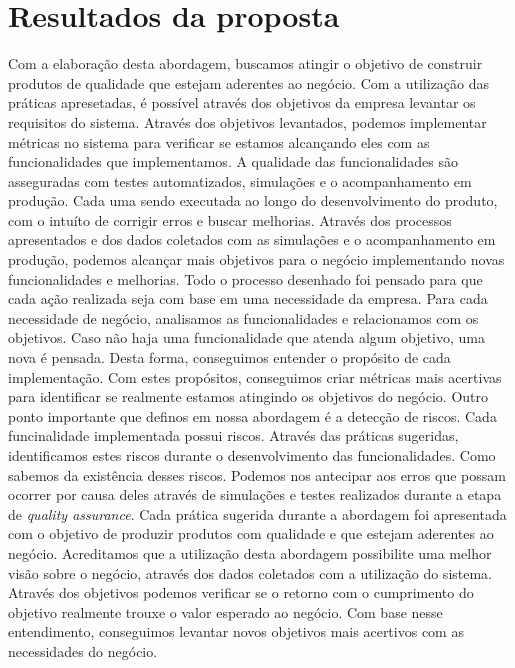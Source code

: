   \section{Resultados da proposta}
    Com a elaboração desta abordagem, buscamos atingir o objetivo de construir
    produtos de qualidade que estejam aderentes ao negócio. Com a utilização das
    práticas apresetadas, é possível através dos objetivos da empresa levantar os
    requisitos do sistema. Através dos objetivos levantados, podemos implementar
    métricas no sistema para verificar se estamos alcançando eles com as funcionalidades
    que implementamos. \newline
    A qualidade das funcionalidades são asseguradas com testes automatizados,
    simulações e o acompanhamento em produção. Cada uma sendo executada ao longo
    do desenvolvimento do produto, com o intuíto de corrigir erros e buscar melhorias.
    Através dos processos apresentados e dos dados coletados com as simulações e
    o acompanhamento em produção, podemos alcançar mais objetivos para o negócio
    implementando novas funcionalidades e melhorias. Todo o processo desenhado foi
    pensado para que cada ação realizada seja com base em uma necessidade da empresa.
    Para cada necessidade de negócio, analisamos as funcionalidades e relacionamos
    com os objetivos. Caso não haja uma funcionalidade que atenda algum objetivo,
    uma nova é pensada. Desta forma, conseguimos entender o propósito de cada
    implementação. Com estes propósitos, conseguimos criar métricas mais acertivas
    para identificar se realmente estamos atingindo os objetivos do negócio. \newline
    Outro ponto importante que definos em nossa abordagem é a detecção de riscos.
    Cada funcinalidade implementada possui riscos. Através das práticas sugeridas,
    identificamos estes riscos durante o desenvolvimento das funcionalidades. Como
    sabemos da existência desses riscos. Podemos nos antecipar aos erros que possam
    ocorrer por causa deles através de simulações e testes realizados durante a
    etapa de \textit{quality assurance}. \newline
    Cada prática sugerida durante a abordagem foi apresentada com o objetivo de
    produzir produtos com qualidade e que estejam aderentes ao negócio. Acreditamos
    que a utilização desta abordagem possibilite uma melhor visão sobre o negócio,
    através dos dados coletados com a utilização do sistema. Através dos objetivos
    podemos verificar se o retorno com o cumprimento do objetivo realmente trouxe
    o valor esperado ao negócio. Com base nesse entendimento, conseguimos levantar
    novos objetivos mais acertivos com as necessidades do negócio.
